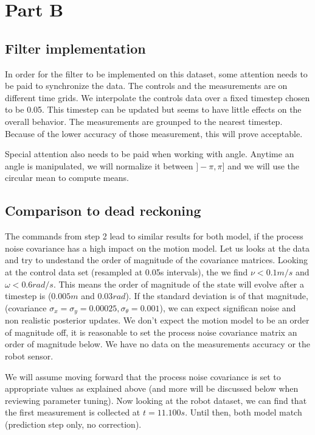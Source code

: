 \documentclass{article}
\begin{document}
\section{Part B}
\subsection{Filter implementation}

In order for the filter to be implemented on this dataset, some attention needs to be paid to synchronize the data. The controls and the measurements are on different time grids. We interpolate the controls data over a fixed timestep chosen to be 0.05. This timestep can be updated but seems to have little effects on the overall behavior. The measurements are grounped to the nearest timestep. Because of the lower accuracy of those measurement, this will prove acceptable.

Special attention also needs to be paid when working with angle. Anytime an angle is manipulated, we will normalize it between $]-\pi,\pi]$ and we will use the circular mean to compute means.


\subsection{Comparison to dead reckoning}
The commands from step 2 lead to similar results for both model, if the process noise covariance has a high impact on the motion model.
Let us looks at the data and try to undestand the order of magnitude of the covariance matrices.
Looking at the control data set (resampled at 0.05s intervals), the we find $\nu<0.1m/s$ and $\omega<0.6rad/s$. This means the order of magnitude of the state will evolve after a timestep is ($0.005m$ and $0.03rad$). If the standard deviation is of that magnitude, (covariance $\sigma_x=\sigma_y=0.00025,\sigma_\theta=0.001$), we can expect significan noise and non realistic posterior updates. 
We don't expect the motion model to be an order of magnitude off, it is reasonable to set the process noise covariance matrix an order of magnitude below.
We have no data on the measurements accuracy or the robot sensor.

We will assume moving forward that the process noise covariance is set to appropriate values as explained above (and more will be discussed below when reviewing parameter tuning).
Now looking at the robot dataset, we can find that the first measurement is collected at $t=11.100s$. Until then, both model match (prediction step only, no correction).
\end{document}
